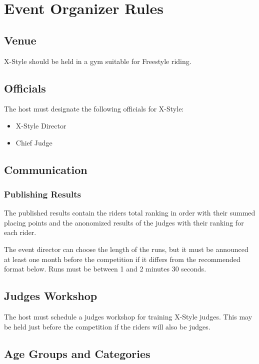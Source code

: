 \chapter{Event Organizer Rules}

\section{Venue}

X-Style should be held in a gym suitable for Freestyle riding. %

\section{Officials}

The host must designate the following officials for X-Style:
\begin{itemize}
\item X-Style Director
\item Chief Judge
\end{itemize}

\section{Communication}

\subsection{Publishing Results}
The published results contain the riders total ranking in order with their summed placing points and the anonomized results of the judges with their ranking for each rider.

The event director can choose the length of the runs, but it must be announced at least one month before the competition if it differs from the recommended format below.
Runs must be between 1 and 2 minutes 30 seconds.

\section{Judges Workshop}

The host must schedule a judges workshop for training X-Style judges.
This may be held just before the competition if the riders will also be judges.

\section{Age Groups and Categories}

